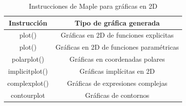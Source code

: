 \begin{bibunit}[plain]
\begin{table}[h!]
	\caption{Instrucciones de Maple para gráficas en 2D}
	\begin{center}
		\begin{tabular}{|c|c|} \hline
			Instrucción & Tipo de gráfica generada \\ \hline
			plot() & Gráficas en 2D de funciones explicitas \\ \hline
			plot() & Gráficas en 2D de funciones paramétricas \\ \hline
			polarplot() & Gráficas en coordenadas polares \\ \hline
			implicitplot() & Gráficas implícitas en 2D \\ \hline
			complexplot() & Gráficas de expresiones complejas \\ \hline
			contourplot & Gráficas de contornos \\\hline
		\end{tabular}
	\end{center}
	\label{tab:cap1t1}
\end{table}

\putbib[mibiblio]

\end{bibunit}

